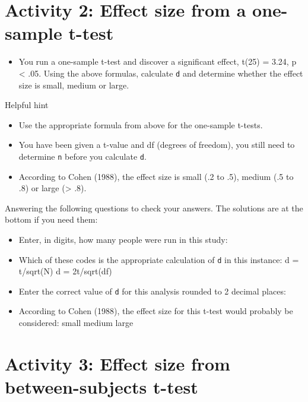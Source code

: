 \documentclass[]{book}
\providecommand{\tightlist}{%
  \setlength{\itemsep}{0pt}\setlength{\parskip}{0pt}}
\begin{document}
\hypertarget{activity-2-effect-size-from-a-one-sample-t-test}{%
\section{Activity 2: Effect size from a one-sample t-test}\label{activity-2-effect-size-from-a-one-sample-t-test}}

\begin{itemize}
\tightlist
\item
  You run a one-sample t-test and discover a significant effect, t(25) = 3.24, p \textless{} .05. Using the above formulas, calculate \texttt{d} and determine whether the effect size is small, medium or large.
\end{itemize}

Helpful hint

\begin{itemize}
\tightlist
\item
  Use the appropriate formula from above for the one-sample t-tests.
\item
  You have been given a t-value and df (degrees of freedom), you still need to determine \texttt{n} before you calculate \texttt{d}.
\item
  According to Cohen (1988), the effect size is small (.2 to .5), medium (.5 to .8) or large (\textgreater{} .8).
\end{itemize}

Answering the following questions to check your answers. The solutions are at the bottom if you need them:

\begin{itemize}
\tightlist
\item
  Enter, in digits, how many people were run in this study: 
\item
  Which of these codes is the appropriate calculation of \texttt{d} in this instance: d = t/sqrt(N) d = 2t/sqrt(df)
\item
  Enter the correct value of \texttt{d} for this analysis rounded to 2 decimal places: 
\item
  According to Cohen (1988), the effect size for this t-test would probably be considered: small medium large
\end{itemize}

\hypertarget{activity-3-effect-size-from-between-subjects-t-test}{%
\section{Activity 3: Effect size from between-subjects t-test}\label{activity-3-effect-size-from-between-subjects-t-test}}
\end{document}
